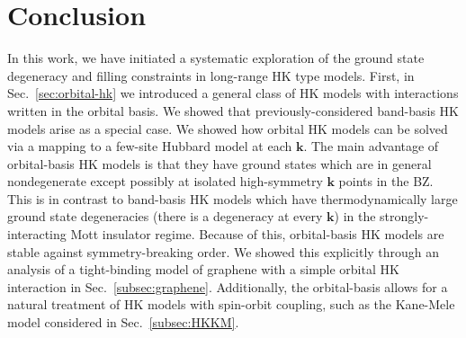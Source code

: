 \documentclass[prb,aps,amssymb,twocolumn,notitlepage]{revtex4-2}
\begin{document}
\section{Conclusion}\label{sec:conclusion}
In this work, we have initiated a systematic exploration of the ground state degeneracy and filling constraints in long-range HK type models. 
First, in Sec.~\ref{sec:orbital-hk} we introduced a general class of HK models with interactions written in the orbital basis. 
We showed that previously-considered band-basis HK models arise as a special case. 
We showed how orbital HK models can be solved via a mapping to a few-site Hubbard model at each $\mathbf{k}$. 
The main advantage of orbital-basis HK models is that they have ground states which are in general nondegenerate except possibly at isolated high-symmetry $\mathbf{k}$ points in the BZ. 
This is in contrast to band-basis HK models which have thermodynamically large ground state degeneracies (there is a degeneracy at every $\mathbf{k}$) in the strongly-interacting Mott insulator regime. 
Because of this, orbital-basis HK models are stable against symmetry-breaking order. 
We showed this explicitly through an analysis of a tight-binding model of graphene with a simple orbital HK interaction in Sec.~\ref{subsec:graphene}. 
Additionally, the orbital-basis allows for a natural treatment of HK models with spin-orbit coupling, such as the Kane-Mele model considered in Sec.~\ref{subsec:HKKM}. 
\end{document}
